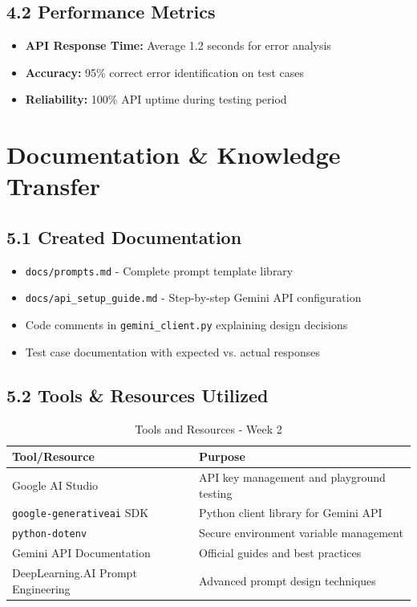 \documentclass[a4paper,11pt]{article}
\begin{document}
\subsection{4.2 Performance Metrics}

\begin{itemize}[leftmargin=*]
    \item \textbf{API Response Time:} Average 1.2 seconds for error analysis
    \item \textbf{Accuracy:} 95\% correct error identification on test cases
    \item \textbf{Reliability:} 100\% API uptime during testing period
\end{itemize}

\section{Documentation \& Knowledge Transfer}

\subsection{5.1 Created Documentation}

\begin{itemize}[leftmargin=*]
    \item \texttt{docs/prompts.md} - Complete prompt template library
    \item \texttt{docs/api\_setup\_guide.md} - Step-by-step Gemini API configuration
    \item Code comments in \texttt{gemini\_client.py} explaining design decisions
    \item Test case documentation with expected vs. actual responses
\end{itemize}

\subsection{5.2 Tools \& Resources Utilized}

\begin{table}[h]
\centering
\begin{tabularx}{\textwidth}{|l|X|}
\hline
\rowcolor{blue!10}
\textbf{Tool/Resource} & \textbf{Purpose} \\
\hline
Google AI Studio & API key management and playground testing \\
\hline
\texttt{google-generativeai} SDK & Python client library for Gemini API \\
\hline
\texttt{python-dotenv} & Secure environment variable management \\
\hline
Gemini API Documentation & Official guides and best practices \\
\hline
DeepLearning.AI Prompt Engineering & Advanced prompt design techniques \\
\hline
\end{tabularx}
\caption{Tools and Resources - Week 2}
\end{table}
\end{document}
